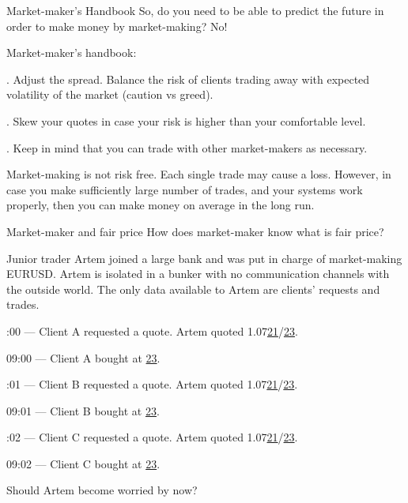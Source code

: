 \documentclass{beamer}
\begin{document}
\begin{frame}{Market-maker's Handbook}
\justify
So, do you need to be able to predict the future in order to make money by market-making? No!

\justify
Market-maker's handbook:

. Adjust the spread. Balance the risk of clients trading away with expected volatility of the market (caution vs greed).

. Skew your quotes in case your risk is higher than your comfortable level.

. Keep in mind that you can trade with other market-makers as necessary.

\justify
Market-making is not risk free. Each single trade may cause a loss. However, in case you make sufficiently large number of trades,
and your systems work properly, then you can make money on average in the long run.
\end{frame}



\begin{frame}{Market-maker and fair price}
\justify
How does market-maker know what is \alert{fair} price?

\justify
Junior trader Artem joined a large bank and was put in charge of market-making EURUSD. Artem is isolated in a bunker with no communication channels with the outside world. The only data available to Artem are clients' requests and trades.

:00 --- Client A requested a quote. Artem quoted 1.07\underline{21}/\underline{23}.

09:00 --- Client A bought at \underline{23}.

:01 --- Client B requested a quote. Artem quoted 1.07\underline{21}/\underline{23}.

09:01 --- Client B bought at \underline{23}.

:02 --- Client C requested a quote. Artem quoted 1.07\underline{21}/\underline{23}.

09:02 --- Client C bought at \underline{23}.

\justify
Should Artem become worried by now?
\end{frame}
\end{document}

